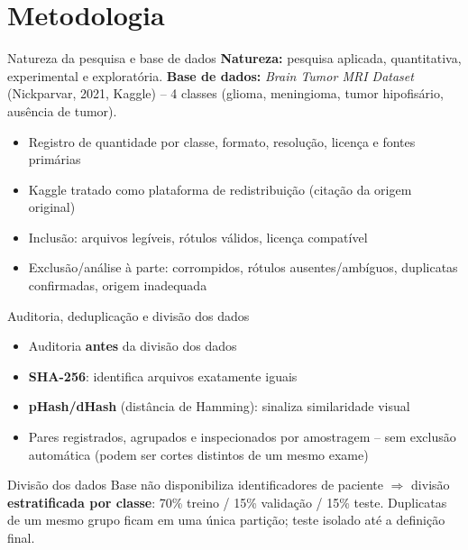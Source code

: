 \documentclass[aspectratio=169]{beamer}
\begin{document}
\section{Metodologia}
\begin{frame}{Natureza da pesquisa e base de dados}
  \textbf{Natureza:} pesquisa aplicada, quantitativa, experimental e exploratória.
  \vspace{6pt}
  \textbf{Base de dados:} \textit{Brain Tumor MRI Dataset} (Nickparvar, 2021, Kaggle) -- 4 classes (glioma, meningioma, tumor hipofisário, ausência de tumor).
  \begin{itemize}
    \item Registro de quantidade por classe, formato, resolução, licença e fontes primárias
    \item Kaggle tratado como plataforma de redistribuição (citação da origem original)
    \item Inclusão: arquivos legíveis, rótulos válidos, licença compatível
    \item Exclusão/análise à parte: corrompidos, rótulos ausentes/ambíguos, duplicatas confirmadas, origem inadequada
  \end{itemize}
\end{frame}

\begin{frame}{Auditoria, deduplicação e divisão dos dados}
  \begin{itemize}
    \item Auditoria \textbf{antes} da divisão dos dados
    \item \textbf{SHA-256}: identifica arquivos exatamente iguais
    \item \textbf{pHash/dHash} (distância de Hamming): sinaliza similaridade visual
    \item Pares registrados, agrupados e inspecionados por amostragem -- sem exclusão automática (podem ser cortes distintos de um mesmo exame)
  \end{itemize}
  \begin{alertblock}{Divisão dos dados}
    Base não disponibiliza identificadores de paciente \(\Rightarrow\) divisão \textbf{estratificada por classe}: 70\% treino / 15\% validação / 15\% teste. Duplicatas de um mesmo grupo ficam em uma única partição; teste isolado até a definição final.
  \end{alertblock}
\end{frame}
\end{document}
